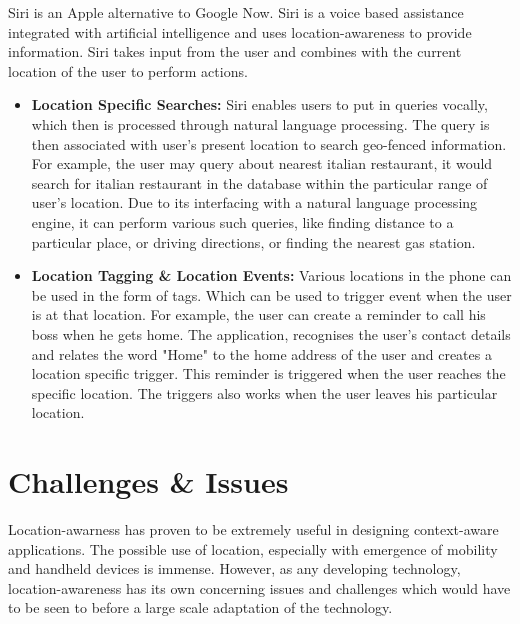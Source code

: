 \documentclass[12pt]{report}
\begin{document}
Siri\cite{siri2014} is an Apple alternative to Google Now. Siri is a voice based assistance integrated with artificial intelligence and uses location-awareness to provide information. Siri takes input from the user and combines with the current location of the user to perform actions.

\begin{itemize}
\item \textbf{Location Specific Searches:} Siri enables users to put in queries vocally, which then is processed through natural language processing. The query is then associated with user's present location to search geo-fenced information. For example, the user may query about nearest italian restaurant, it would search for italian restaurant in the database within the particular range of user's location. Due to its interfacing with a natural language processing engine, it can perform various such queries, like finding distance to a particular place, or driving directions, or finding the nearest gas station.

\item \textbf{Location Tagging \& Location Events:} Various locations in the phone can be used in the form of tags. Which can be used to trigger event when the user is at that location. For example, the user can create a reminder to call his boss when he gets home. The application, recognises the user's contact details and relates the word "Home" to the home address of the user and creates a location specific trigger. This reminder is triggered when the user reaches the specific location. The triggers also works when the user leaves his particular location.

\end{itemize}

\chapter{Challenges \& Issues}

Location-awarness has proven to be extremely useful in designing context-aware applications. The possible use of location, especially with emergence of mobility and handheld devices is immense. However, as any developing technology, location-awareness has its own concerning issues and challenges which would have to be seen to before a large scale adaptation of the technology.
\end{document}
